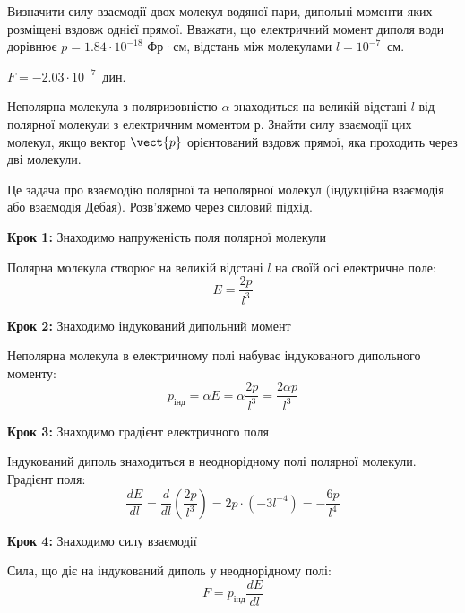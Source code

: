 \begin{problem}%
    Визначити силу взаємодії двох молекул водяної пари, дипольні моменти яких розміщені вздовж однієї прямої. Вважати, що електричний момент диполя води дорівнює $p = 1.84 \cdot 10^{-18}$ Фр·см, відстань між молекулами $l = 10^{-7}$~см.
\begin{solution}
$F = −2.03 \cdot 10^{−7}$~дин.
\end{solution}
\end{problem}


\begin{problem}%
    Неполярна молекула з поляризовністю $\alpha$ знаходиться на
великій відстані $l$ від полярної молекули з електричним
моментом $р$. Знайти силу взаємодії цих молекул, якщо
вектор $\vect{p}$ орієнтований вздовж прямої, яка проходить через
дві молекули.
\begin{solution}
Це задача про взаємодію полярної та неполярної молекул (індукційна взаємодія або взаємодія Дебая). Розв'яжемо через силовий підхід.

\textbf{Крок 1:} Знаходимо напруженість поля полярної молекули

Полярна молекула створює на великій відстані $l$ на своїй осі електричне поле:
\begin{equation}
E = \frac{2p}{l^3}
\end{equation}

\textbf{Крок 2:} Знаходимо індукований дипольний момент

Неполярна молекула в електричному полі набуває індукованого дипольного моменту:
\begin{equation}
p_{\text{інд}} = \alpha E = \alpha \frac{2p}{l^3} = \frac{2\alpha p}{l^3}
\end{equation}

\textbf{Крок 3:} Знаходимо градієнт електричного поля

Індукований диполь знаходиться в неоднорідному полі полярної молекули. Градієнт поля:
\begin{equation}
\frac{dE}{dl} = \frac{d}{dl}\left(\frac{2p}{l^3}\right) = 2p \cdot (-3l^{-4}) = -\frac{6p}{l^4}
\end{equation}

\textbf{Крок 4:} Знаходимо силу взаємодії

Сила, що діє на індукований диполь у неоднорідному полі:
\begin{equation}
F = p_{\text{інд}} \frac{dE}{dl}
\end{equation}


\end{solution}
\end{problem}
